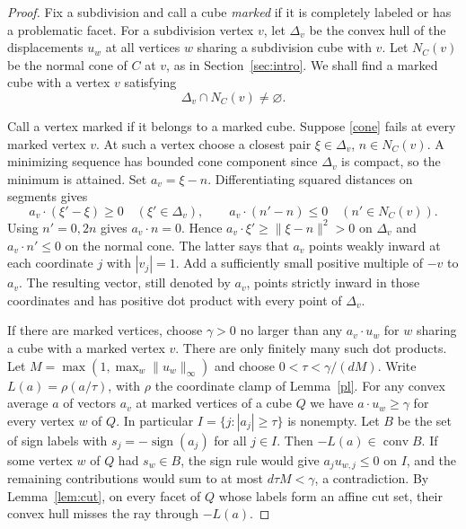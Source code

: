 \documentclass[11pt]{amsart}
\theoremstyle{definition}
\theoremstyle{remark}
\numberwithin{equation}{section}
\DeclareMathOperator{\conv}{conv}
\begin{document}
\begin{proof}
Fix a subdivision and call a cube \emph{marked} if it is completely labeled or has a problematic facet. For a subdivision vertex $v$, let $\Delta_v$ be the convex hull of the displacements $u_w$ at all vertices $w$ sharing a subdivision cube with $v$. Let $N_C(v)$ be the normal cone of $C$ at $v$, as in Section~\ref{sec:intro}. We shall find a marked cube with a vertex $v$ satisfying
\begin{equation}\label{cone}
                         \Delta_v\cap N_C(v)\ne\varnothing .
\end{equation}

Call a vertex marked if it belongs to a marked cube. Suppose \eqref{cone} fails at every marked vertex $v$. At such a vertex choose a closest pair $\xi\in \Delta_v$, $n\in N_C(v)$. A minimizing sequence has bounded cone component since $\Delta_v$ is compact, so the minimum is attained. Set $a_v=\xi-n$. Differentiating squared distances on segments gives
\[
  a_v\cdot(\xi'-\xi)\ge0\quad(\xi'\in \Delta_v),\qquad
  a_v\cdot(n'-n)\le0\quad(n'\in N_C(v)).
\]
Using $n'=0,2n$ gives $a_v\cdot n=0$. Hence $a_v\cdot \xi'\ge\|\xi-n\|^2>0$ on $\Delta_v$ and $a_v\cdot n'\le0$ on the normal cone. The latter says that $a_v$ points weakly inward at each coordinate $j$ with $|v_j|=1$. Add a sufficiently small positive multiple of $-v$ to $a_v$. The resulting vector, still denoted by $a_v$, points strictly inward in those coordinates and has positive dot product with every point of $\Delta_v$.

If there are marked vertices, choose $\gamma>0$ no larger than any $a_v\cdot u_w$ for $w$ sharing a cube with a marked vertex $v$. There are only finitely many such dot products. Let $M=\max(1,\max_w\|u_w\|_\infty)$ and choose $0<\tau<\gamma/(dM)$. Write $L(a)=\rho(a/\tau)$, with $\rho$ the coordinate clamp of Lemma~\ref{pl}. For any convex average $a$ of vectors $a_v$ at marked vertices of a cube $Q$ we have $a\cdot u_w\ge\gamma$ for every vertex $w$ of $Q$. In particular $I=\{j:|a_j|\ge\tau\}$ is nonempty. Let $B$ be the set of sign labels with $s_j=-\operatorname{sign}(a_j)$ for all $j\in I$. Then $-L(a)\in\conv B$. If some vertex $w$ of $Q$ had $s_w\in B$, the sign rule would give $a_j u_{w,j}\le0$ on $I$, and the remaining contributions would sum to at most $d\tau M<\gamma$, a contradiction. By Lemma~\ref{lem:cut}, on every facet of $Q$ whose labels form an affine cut set, their convex hull misses the ray through $-L(a)$.


\end{proof}
\end{document}
